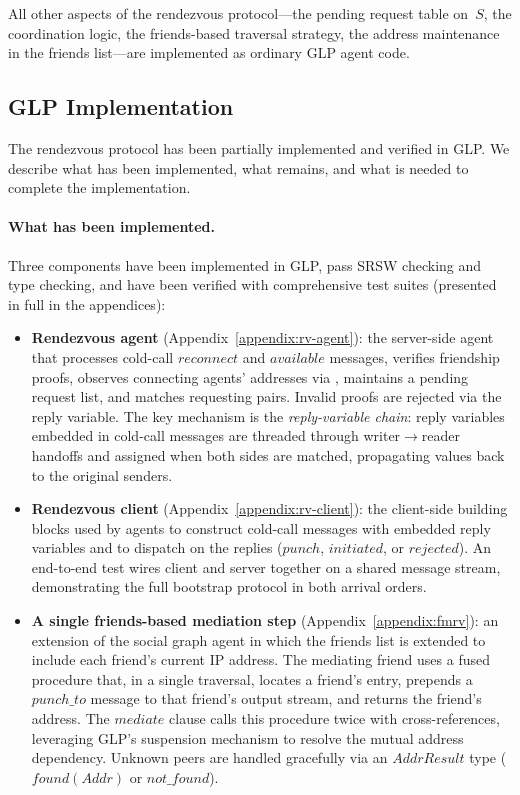 All other aspects of the rendezvous protocol---the pending request table on~$S$, the coordination logic, the friends-based traversal strategy, the address maintenance in the friends list---are implemented as ordinary GLP agent code.

\subsection{GLP Implementation}
\label{sec:rv-glp-impl}
The rendezvous protocol has been partially implemented and verified in GLP.  We describe what has been implemented, what remains, and what is needed to complete the implementation.

\paragraph{What has been implemented.}
Three components have been implemented in GLP, pass SRSW checking and type checking, and have been verified with comprehensive test suites (presented in full in the appendices):
\begin{itemize}
\item \textbf{Rendezvous agent} (Appendix~\ref{appendix:rv-agent}): the server-side agent that processes cold-call $\mathit{reconnect}$ and $\mathit{available}$ messages, verifies friendship proofs, observes connecting agents' addresses via , maintains a pending request list, and matches requesting pairs.  Invalid proofs are rejected via the reply variable.  The key mechanism is the \emph{reply-variable chain}: reply variables embedded in cold-call messages are threaded through writer$\to$reader handoffs and assigned when both sides are matched, propagating values back to the original senders.

\item \textbf{Rendezvous client} (Appendix~\ref{appendix:rv-client}): the client-side building blocks used by agents to construct cold-call messages with embedded reply variables and to dispatch on the replies ($\mathit{punch}$, $\mathit{initiated}$, or $\mathit{rejected}$).  An end-to-end test wires client and server together on a shared message stream, demonstrating the full bootstrap protocol in both arrival orders.

\item \textbf{A single friends-based mediation step} (Appendix~\ref{appendix:fmrv}): an extension of the social graph agent in which the friends list is extended to include each friend's current IP address.  The mediating friend uses a fused  procedure that, in a single traversal, locates a friend's entry, prepends a $\mathit{punch\_to}$ message to that friend's output stream, and returns the friend's address.  The $\mathit{mediate}$ clause calls this procedure twice with cross-references, leveraging GLP's suspension mechanism to resolve the mutual address dependency.  Unknown peers are handled gracefully via an $\mathit{AddrResult}$ type ($\mathit{found}(\mathit{Addr})$ or $\mathit{not\_found}$).
\end{itemize}

